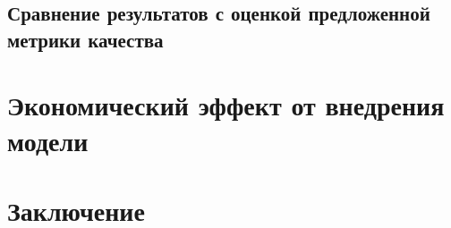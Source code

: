 \documentclass[12pt,a4paper]{article} %
\begin{document}
\subsection{Сравнение результатов с оценкой предложенной метрики качества}



\newpage
\section{Экономический эффект от внедрения модели}



\newpage
\section{Заключение}





\newpage



\nocite{GV}
\end{document}
